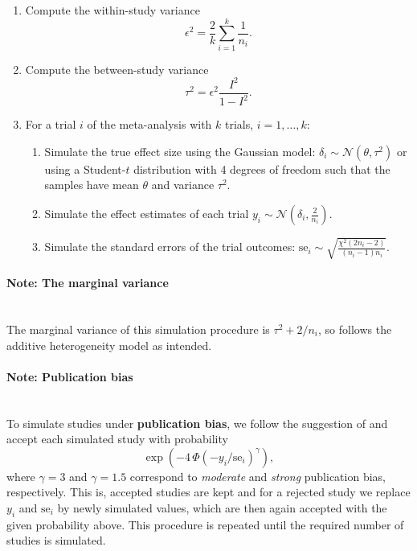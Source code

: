 \documentclass[letterpaper, 12pt]{article}
\newcommand{\N}{\mathcal{N}}
\begin{document}
\begin{enumerate}
\item Compute the within-study variance
  \begin{equation} \label{eq:eps2}
    \epsilon^2 = \frac{2}{k} \sum\limits_{i=1}^k \frac{1}{n_i}.
  \end{equation}
\item Compute the between-study variance
  \begin{equation}\label{eq:eq1}
    \tau^2 = \epsilon^2 \frac{I^2}{1-I^2}.
  \end{equation}
\item For a trial $i$ of the meta-analysis with $k$ trials, $i = 1, \dots, k$:
  \begin{enumerate}
    \item Simulate the true effect size using the Gaussian model:
      $\delta_i \sim \N(\theta, \tau^2)$ or using a Student-$t$ distribution
      with 4 degrees of freedom such that the samples have mean $\theta$ and
      variance $\tau^2$.
    \item Simulate the effect estimates of each trial
      $y_i \sim \N(\delta_i, \frac{2}{n_i})$.
    \item Simulate the standard errors of the trial outcomes:
      $\text{se}_i \sim \sqrt{\frac{\chi^2(2n_i-2)}{(n_i-1)n_i}}$.
  \end{enumerate}
\end{enumerate}

\paragraph{Note: The marginal variance}\mbox{}\\
The marginal variance of this simulation procedure is
$\tau^2 + 2/n_i$, so follows the additive heterogeneity model as intended.

\paragraph{Note: Publication bias}\mbox{}\\
To simulate studies under \textbf{publication bias}, we follow the suggestion
of \citet{henm:copa:10} and accept each simulated study with probability
\begin{equation} \label{eq:pbias}
\exp(-4\, \Phi(-y_i / \text{se}_i)^\gamma ),
\end{equation}
where $\gamma = 3$ and $\gamma = 1.5$ correspond to \emph{moderate} and
\emph{strong} publication bias, respectively.
This is, accepted studies are kept and for a rejected study we replace $y_i$
and $\text{se}_i$ by newly simulated values, which are then again accepted
with the given probability above. This procedure is repeated until the required
number of studies is simulated. 
\end{document}
